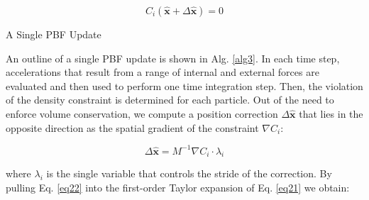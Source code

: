 \documentclass[
	11pt, 
	DIV10,
	ngerman,
	a4paper, 
	oneside, 
	headings=normal, 
	captions=tableheading,
	final, 
	numbers=noenddot
]{scrartcl}
\begin{document}
\begin{equation}
	\label{eq21}
	C_{i}(\hat{\boldsymbol{x}} + \Delta \hat{\boldsymbol{x}}) = 0
\end{equation}

\medskip
\begin{algorithm}[H]
	\DontPrintSemicolon
	\SetAlgoLined
	\caption{\label{alg3} A Single PBF Update}
\end{algorithm}
\medskip

An outline of a single PBF update is shown in Alg. \ref{alg3}. In each time step, accelerations that result from a range of internal and external forces are evaluated and then used to perform one time integration step. Then, the violation of the density constraint is determined for each particle. Out of the need to enforce volume conservation, we compute a position correction $ \Delta \hat{\boldsymbol{x}} $ that lies in the opposite direction as the spatial gradient of the constraint $ \nabla C_{i} $:

\begin{equation}
	\label{eq22}
	\Delta \hat{\boldsymbol{x}} = M^{-1} \nabla C_{i} \cdot \lambda_{i}
\end{equation}

where $ \lambda_{i} $ is the single variable that controls the stride of the correction. By pulling Eq. \eqref{eq22} into the first-order Taylor expansion of Eq. \eqref{eq21} we obtain:
\end{document}
